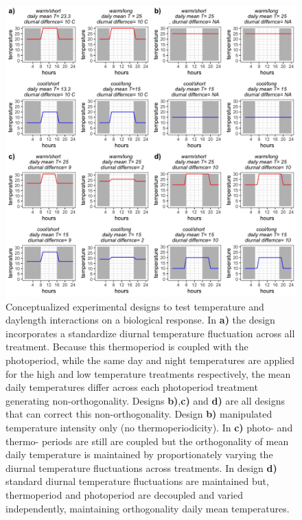 \documentclass[11pt]{article}
\begin{document}
\begin{figure}[h!]
    \centering
 \includegraphics[width=\textwidth]{..//Plots/periodicity_figures/designs.jpeg}
    \caption{Conceptualized experimental designs to test temperature and daylength interactions on a biological response. In \textbf{a)} the design incorporates a standardize diurnal temperature fluctuation across all treatment. Because this thermoperiod is coupled with the photoperiod, while the same day and night temperatures are applied for the high and low temperature treatments respectively, the mean daily temperatures differ across each photoperiod treatment generating non-orthogonality. Designs \textbf{b)},\textbf{c)} and \textbf{d)} are all designs that can  correct this non-orthogonality. Design \textbf{b)}  manipulated temperature intensity only (no thermoperiodicity).%
    In  \textbf{c)} photo- and thermo- periods are still are coupled but the orthogonality of mean daily temperature is maintained by proportionately varying the diurnal temperature fluctuations across treatments. %
    In design \textbf{d)} standard diurnal temperature fluctuations are maintained but, thermoperiod and photoperiod are decoupled and varied independently, maintaining orthogonality daily mean temperatures.}%
    \label{fig:ortho}
\end{figure}
 
\end{document}
